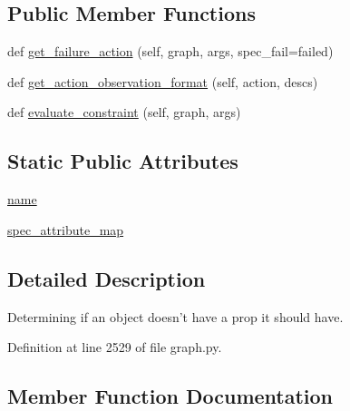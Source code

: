 \subsection*{Public Member Functions}
\begin{DoxyCompactItemize}
\item 
def \hyperlink{classlight__chats_1_1graph_1_1HasPropConstraint_aff9fe175fee6b71e845e03433593814c}{get\+\_\+failure\+\_\+action} (self, graph, args, spec\+\_\+fail=\textquotesingle{}failed\textquotesingle{})
\item 
def \hyperlink{classlight__chats_1_1graph_1_1HasPropConstraint_a306f2581a6d32cec3edd07fda539429a}{get\+\_\+action\+\_\+observation\+\_\+format} (self, action, descs)
\item 
def \hyperlink{classlight__chats_1_1graph_1_1HasPropConstraint_a02fd1d0ec2da38cecbe274d0de49e993}{evaluate\+\_\+constraint} (self, graph, args)
\end{DoxyCompactItemize}
\subsection*{Static Public Attributes}
\begin{DoxyCompactItemize}
\item 
\hyperlink{classlight__chats_1_1graph_1_1HasPropConstraint_a82dbfb2fb15ed5d9e475a1abeccc2e70}{name}
\item 
\hyperlink{classlight__chats_1_1graph_1_1HasPropConstraint_a7157789f0a8c670ce06d73e7022c35a6}{spec\+\_\+attribute\+\_\+map}
\end{DoxyCompactItemize}


\subsection{Detailed Description}
\begin{DoxyVerb}Determining if an object doesn't have a prop it should have.
\end{DoxyVerb}
 

Definition at line 2529 of file graph.\+py.



\subsection{Member Function Documentation}
\mbox{\label{classlight__chats_1_1graph_1_1HasPropConstraint_a02fd1d0ec2da38cecbe274d0de49e993}} 
